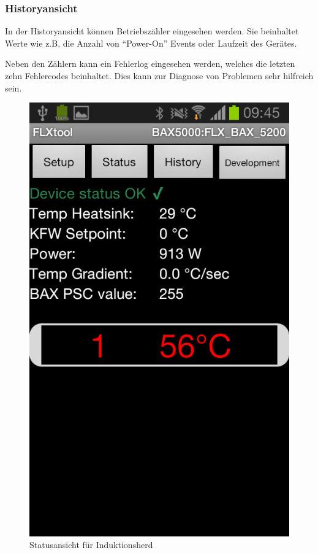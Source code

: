 \subsubsection{Historyansicht}
\label{subsubsec:Ansichten}
In der Historyansicht können Betriebszähler eingesehen werden. Sie beinhaltet Werte wie z.B. die Anzahl von \enquote{Power-On} Events oder Laufzeit des Gerätes.

Neben den Zählern kann ein Fehlerlog eingesehen werden, welches die letzten zehn Fehlercodes beinhaltet. Dies kann zur Diagnose von Problemen sehr hilfreich sein.

\begin{figure}
	\includegraphics[scale=0.3]{analysis/res/ShowStatusInduction}
	\caption{Statusansicht für Induktionsherd}
\end{figure}

